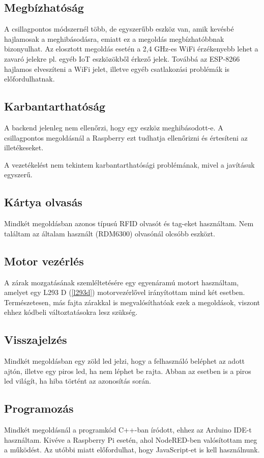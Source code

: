 \documentclass[
]{thesis-ekf}
\theoremstyle{definition}
\theoremstyle{remark}
\begin{document}
\subsection*{Megbízhatóság} 
    A csillagpontos módszernél több, de egyszerűbb eszköz van, amik kevésbé hajlamosak a meghibásodásra, emiatt ez a megoldás megbízhatóbbnak bizonyulhat.
    Az elosztott megoldás esetén a 2,4 GHz-es WiFi érzékenyebb lehet a zavaró jelekre pl. egyéb IoT eszközökből érkező jelek. Továbbá az ESP-8266 hajlamos elveszíteni a WiFi jelet, illetve egyéb csatlakozási problémák is előfordulhatnak.

\subsection*{Karbantarthatóság}
A backend jelenleg nem ellenőrzi, hogy egy eszköz meghibásodott-e. A csillagpontos megoldásnál a Raspberry ezt tudhatja ellenőrizni és értesíteni az illetékeseket.

A vezetékelést nem tekintem karbantarthatósági problémának, mivel a javításuk egyszerű.

\subsection*{Kártya olvasás}
Mindkét megoldásban azonos típusú RFID olvasót és tag-eket használtam. Nem találtam az általam használt (RDM6300) olvasónál olcsóbb eszközt.
 
\subsection*{Motor vezérlés}
A zárak mozgatásának szemléltetésére egy egyenáramú motort használtam, amelyet egy L293 D (\ref{l293d}) motorvezérlővel irányítottam mind két esetben. Természetesen, más fajta zárakkal is megvalósíthatóak ezek a megoldások, viszont ehhez kódbeli változtatásokra lesz szükség.

\subsection*{Visszajelzés}
Mindkét megoldásban egy zöld led jelzi, hogy a felhasználó beléphet az adott ajtón, illetve egy piros led, ha nem léphet be rajta. Abban az esetben is a piros led világít, ha hiba történt az azonosítás során.

\subsection*{Programozás}
Mindkét megoldásnál a programkód C++-ban íródott, ehhez az Arduino IDE-t használtam. Kivéve a Raspberry Pi esetén, ahol NodeRED-ben valósítottam meg a működést. Az utóbbi miatt előfordulhat, hogy JavaScript-et is kell használnunk.
\end{document}
